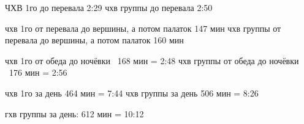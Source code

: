 




ЧХВ 1го до перевала 2:29
чхв группы до перевала 2:50

чхв 1го от перевала до вершины, а потом палаток 147 мин
чхв группы от перевала до вершины, а потом палаток 160 мин

чхв 1го от обеда до ночёвки ~168 мин = 2:48
чхв группы от обеда до ночёвки ~176 мин = 2:56

чхв 1го за день 464 мин = 7:44
чхв группы за день 506 мин = 8:26

гхв группы за день: 612 мин = 10:12



    \FloatBarrier
